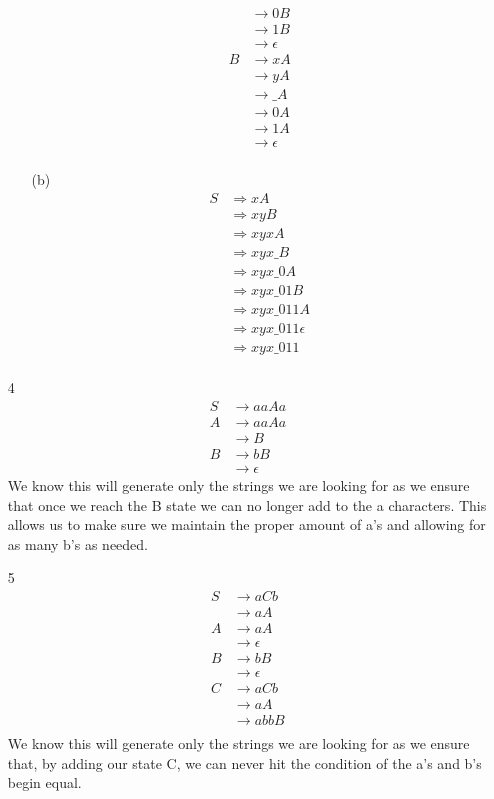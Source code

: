 \documentclass[12pt]{article}
\begin{document}
\begin{enumerate}
\begin{enumerate}
\begin{align*}
					  &\rightarrow 0B \\
					  &\rightarrow 1B \\
					  &\rightarrow \epsilon \\
					B &\rightarrow xA \\
				      &\rightarrow yA \\
				      &\rightarrow \_A \\
				      &\rightarrow 0A \\
					  &\rightarrow 1A \\
					  &\rightarrow \epsilon \\
				\end{align*}
			\item[(b)]
				\begin{align*}
					S &\Rightarrow xA \\
					  &\Rightarrow xyB \\
					  &\Rightarrow xyxA \\
					  &\Rightarrow xyx\_B \\
					  &\Rightarrow xyx\_0A \\
					  &\Rightarrow xyx\_01B \\
					  &\Rightarrow xyx\_011A \\
					  &\Rightarrow xyx\_011\epsilon \\
					  &\Rightarrow xyx\_011 \\
				\end{align*}
		\end{enumerate}
	\item[4]
		\begin{align*}
			S &\rightarrow aaAa \\
			A &\rightarrow aaAa \\
			  &\rightarrow B \\
			B &\rightarrow bB \\
		      &\rightarrow \epsilon
		\end{align*}
		We know this will generate only the strings we are looking for as we ensure that once we reach the B state we can no longer add to the a characters. This allows us to make sure we maintain the proper amount of a's and allowing for as many b's as needed.
	\item[5]
		\begin{align*}
			S &\rightarrow aCb\\
			  &\rightarrow aA\\
			A &\rightarrow aA\\
			  &\rightarrow \epsilon\\
			B &\rightarrow bB\\
			  &\rightarrow \epsilon\\
			C &\rightarrow aCb\\
			  &\rightarrow aA\\
			  &\rightarrow abbB\\
		\end{align*}
		We know this will generate only the strings we are looking for as we ensure that, by adding our state C, we can never hit the condition of the a's and b's begin equal.
\end{enumerate}
 
\end{document}
